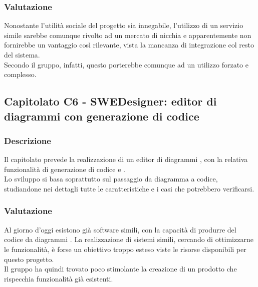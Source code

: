 \subsubsection{Valutazione}
Nonostante l'utilità sociale del progetto sia innegabile, l'utilizzo di un servizio simile sarebbe comunque rivolto ad un mercato di nicchia e apparentemente non fornirebbe un vantaggio così rilevante, vista la mancanza di integrazione col resto del sistema.\\
Secondo il gruppo, infatti, questo porterebbe comunque ad un utilizzo forzato e complesso.

\subsection{Capitolato C6 - SWEDesigner: editor di diagrammi  con generazione di codice}
\subsubsection{Descrizione}
Il capitolato prevede la realizzazione di un editor di diagrammi , con la relativa funzionalità di generazione di codice  e .\\
Lo sviluppo si basa soprattutto sul passaggio da diagramma  a codice, studiandone nei dettagli tutte le caratteristiche e i casi che potrebbero verificarsi.

\subsubsection{Valutazione}
Al giorno d'oggi esistono già software simili, con la capacità di produrre del codice da diagrammi . La realizzazione di sistemi simili, cercando di ottimizzarne le funzionalità, è forse un obiettivo troppo esteso viste le risorse disponibili per questo progetto.\\
Il gruppo ha quindi trovato poco stimolante la creazione di un prodotto che rispecchia funzionalità già esistenti.
